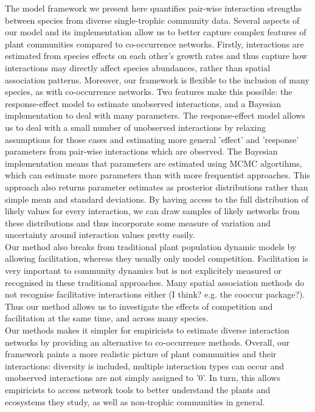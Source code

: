\documentclass[a4,12pt]{article}
\begin{document}
    The model framework we present here quantifies pair-wise interaction strengths between species from diverse single-trophic community data. Several aspects of our model and its implementation allow us to better capture complex features of plant communities compared to co-occurrence networks. Firstly, interactions are estimated from species effects on each other's growth rates and thus capture how interactions may directly affect species abundances, rather than spatial association patterns. Moreover, our framework is flexible to the inclusion of many species, as with co-occurrence networks. Two features make this possible: the response-effect model to estimate unobserved interactions, and a Bayesian implementation to deal with many parameters. The response-effect model allows us to deal with a small number of unobserved interactions by relaxing assumptions for those cases and estimating more general 'effect' and 'response' parameters from  pair-wise interactions which are observed. The Bayesian implementation means that parameters are estimated using MCMC algortihms, which can estimate more parameters than with more frequentist approaches. This approach also returns parameter estimates as prosterior distributions rather than simple mean and standard deviations. By having access to the full distribution of likely values for every interaction, we can draw samples of likely networks from these distributions and thus incorporate some measure of variation and uncertainty around interaction values pretty easily. \\


    Our method also breaks from traditional plant population dynamic models by allowing facilitation, whereas they usually only model competition. Facilitation is very important to community dynamics but is not explicitely measured or recognised in these traditional approaches. Many spatial association methods do not recognise facilitative interactions either (I think? e.g. the cooccur package?). Thus our method allows us to investigate the effects of competition and facilitation at the same time, and across many species. \\

    Our methods makes it simpler for empiricists to estimate diverse interaction networks by providing an alternative to co-occurrence methods. Overall, our framework paints a more realistic picture of plant communities and their interactions: diversity is included, multiple interaction types can occur and unobserved interactions are not simply assigned to '0'. In turn, this allows empiricists to access network tools to better understand the plants and ecosystems they study, as well as non-trophic communities in general.\\
\end{document}
